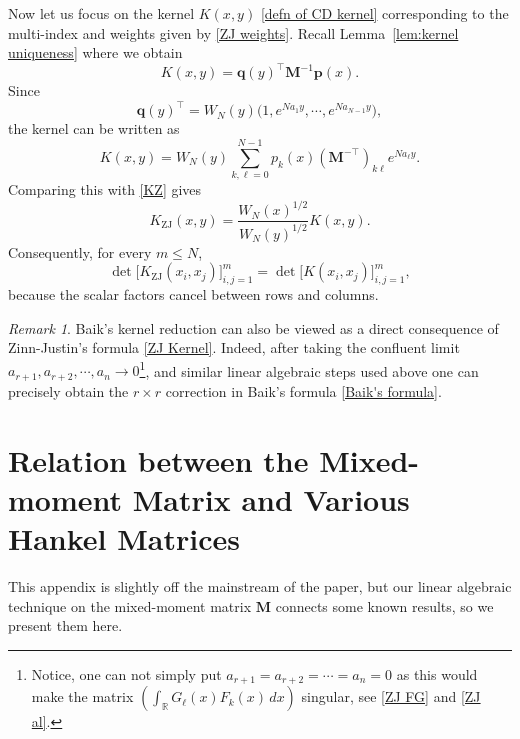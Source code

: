 \documentclass[a4paper,10pt,leqno]{amsart}
\numberwithin{equation}{section}
\theoremstyle{remark}
\newtheorem{remark}{Remark}
\begin{document}
Now let us focus on the kernel $K(x,y)$ \eqref{defn of CD kernel} corresponding to the multi-index and weights given by \eqref{ZJ weights}. 
Recall Lemma~\ref{lem:kernel uniqueness} where we obtain
\[
    K(x,y)=\boldsymbol{q}(y)^{\top}\boldsymbol{M}^{-1}\boldsymbol{p}(x).
\]
Since
\[
    \boldsymbol{q}(y)^{\top}
    =
    W_N(y)
    \bigl(
        1,e^{N a_1y},\cdots,e^{N a_{N-1}y}
    \bigr),
\]
the kernel can be written as
\[
    K(x,y)
    =
    W_N(y)
    \sum_{k,\ell=0}^{N-1}
        p_k(x)
        (\boldsymbol{M}^{-\top})_{k\ell}
        e^{N a_\ell y}.
\]
Comparing this with \eqref{KZ} gives
\[
    K_{\mathrm{ZJ}}(x,y)
    =
    \frac{W_N(x)^{1/2}}{W_N(y)^{1/2}}K(x,y).
\]
Consequently, for every $m\leq N$,
\begin{equation}\label{kernel dets agree}
    \det\bigl[K_{\mathrm{ZJ}}(x_i,x_j)\bigr]_{i,j=1}^{m}
    =
    \det\bigl[K(x_i,x_j)\bigr]_{i,j=1}^{m},
\end{equation}
because the scalar factors cancel between rows and columns.


\begin{remark}
    Baik's kernel reduction can also be viewed as a direct consequence of
Zinn-Justin's formula \eqref{ZJ Kernel}. Indeed, after taking the
confluent limit $a_{r+1}, a_{r+2}, \cdots, a_n \to 0$\footnote{Notice, one can not simply put $a_{r+1}= a_{r+2}= \cdots= a_n = 0$ as this would make the matrix $\left(
        \int_{\mathbb R}G_\ell(x)F_k(x)\,dx
    \right)$ singular, see \eqref{ZJ FG} and \eqref{ZJ al}.}, and similar linear algebraic steps used above one can precisely obtain the
$r\times r$ correction in Baik's formula \eqref{Baik's formula}.
\end{remark}






\appendix

\section{Relation between the Mixed-moment Matrix and Various Hankel Matrices}
\label{Mixed-moment and hankel}

This appendix is slightly off the mainstream of the paper, but our linear algebraic technique on the mixed-moment matrix $\bm{M}$ connects some known results, so we present them here.
\end{document}
